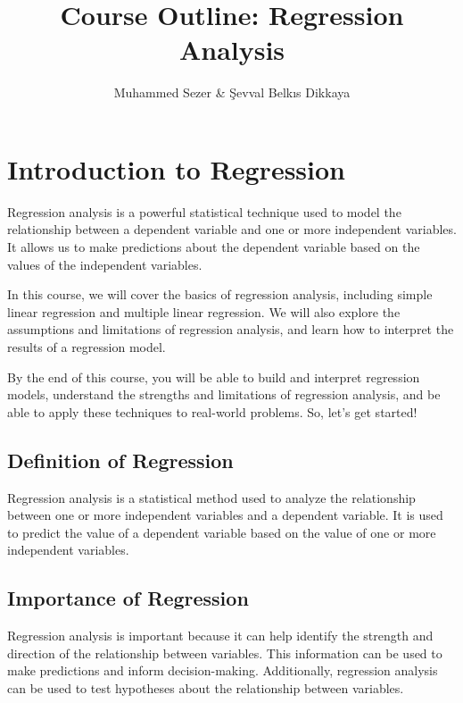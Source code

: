 \documentclass{beamer}
\begin{document}
\title{Course Outline: Regression Analysis}
\author{Muhammed Sezer \& Şevval Belkıs Dikkaya}
\date{}

\maketitle

\section{Introduction to Regression}

Regression analysis is a powerful statistical technique used to model the relationship between a dependent variable and one or more independent variables. It allows us to make predictions about the dependent variable based on the values of the independent variables.

In this course, we will cover the basics of regression analysis, including simple linear regression and multiple linear regression. We will also explore the assumptions and limitations of regression analysis, and learn how to interpret the results of a regression model.

By the end of this course, you will be able to build and interpret regression models, understand the strengths and limitations of regression analysis, and be able to apply these techniques to real-world problems. So, let's get started!

\subsection{Definition of Regression}

Regression analysis is a statistical method used to analyze the relationship between one or more independent variables and a dependent variable. It is used to predict the value of a dependent variable based on the value of one or more independent variables.

\subsection{Importance of Regression}

Regression analysis is important because it can help identify the strength and direction of the relationship between variables. This information can be used to make predictions and inform decision-making. Additionally, regression analysis can be used to test hypotheses about the relationship between variables.
\end{document}
